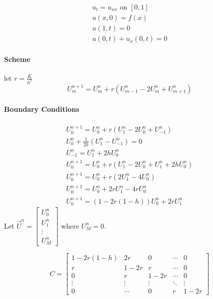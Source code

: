 \begin{example}{}{}
  \begin{align*}
    u_t = u_{xx} \text{ on } [0,1] \\
    u(x, 0) = f(x)                 \\
    u(1, t) = 0                    \\
    u(0, t) + u_x(0, t) = 0
  \end{align*}
  \paragraph{Scheme}
  let \( r= \frac{K}{h^2} \)
  \[
    U_m^{n+1} = U_m^n + r(U_{m-1}^n - 2U_m^n + U_{m+1}^n)
  \]
  \paragraph{Boundary Conditions}
  \begin{align*}
    U_0^{n+1} = U_0^n + r(U_1^n - 2U_0^n + U_{-1}^n)        \\
    U_0^n + \frac{1}{2h}(U_1^n - U_{-1}^n) = 0              \\
    U_{-1}^n = U_1^n + 2hU_0^n                              \\
    U_0^{n+1} = U_0^n + r(U_1^n - 2U_0^n + U_1^n + 2hU_0^n) \\
    U_0^{n+1} = U_0^n + r(2U_1^n - 4U_0^n)                  \\
    U_0^{n+1} = U_0^n + 2rU_1^n - 4rU_0^n                   \\
    U_0^{n+1} = (1 - 2r(1 - h))U_0^n + 2rU_1^n
  \end{align*}
  Let \( \vec{U}^n = \begin{bmatrix} U_0^n \\ U_1^n \\ \vdots \\ U_M^n \end{bmatrix} \) where \( U_M^n = 0 \).

  \[
    C = \begin{bmatrix}
      1 - 2r(1 - h) & 2r     & 0      & \cdots & 0      \\
      r             & 1 - 2r & r      & \cdots & 0      \\
      0             & r      & 1 - 2r & \cdots & 0      \\
      \vdots        & \vdots & \vdots & \ddots & \vdots \\
      0             & \cdots & 0      & r      & 1 - 2r
    \end{bmatrix}
  \]


\end{example}
